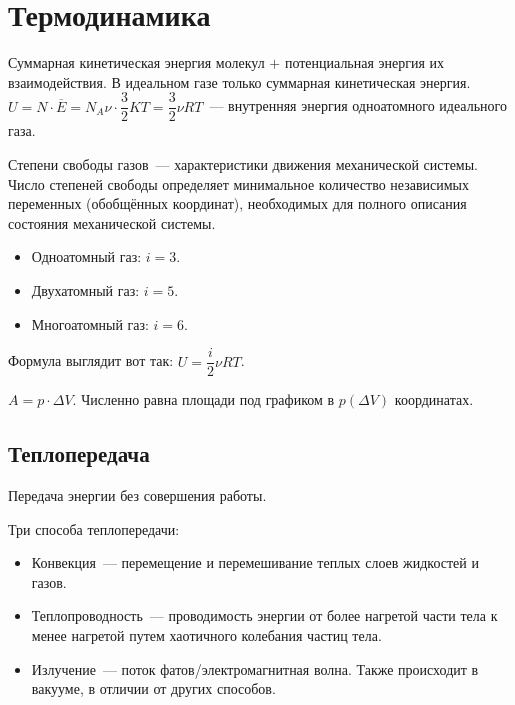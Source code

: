 \documentclass[12pt]{article}
\begin{document}
	\section{Термодинамика}
	\begin{definition}
		Суммарная кинетическая энергия молекул $+$ потенциальная энергия их взаимодействия. В идеальном газе только суммарная кинетическая энергия. $U = N \cdot \overline{E} = N_A \nu \cdot \dfrac{3}{2} KT = \dfrac{3}{2} \nu RT$~--- внутренняя энергия одноатомного идеального газа.
	\end{definition}
	\begin{definition}
		Степени свободы газов~--- характеристики движения механической системы. Число степеней свободы определяет минимальное количество независимых переменных (обобщённых координат), необходимых для полного описания состояния механической системы.
		\begin{itemize}
			\item Одноатомный газ: $i = 3$.
			\item Двухатомный газ: $i = 5$.
			\item Многоатомный газ: $i = 6$.
		\end{itemize}
		Формула выглядит вот так: $U = \dfrac{i}{2} \nu RT$.
	\end{definition}
	\begin{definition}
		$A = p \cdot \varDelta V$. Численно равна площади под графиком в $p(\varDelta V)$ координатах.
	\end{definition}
	\subsection{Теплопередача}
	\begin{definition}[Теплопередача]
		Передача энергии без совершения работы.
	\end{definition}
	Три способа теплопередачи:
	\begin{itemize}
		\item Конвекция~--- перемещение и перемешивание теплых слоев жидкостей и газов.
		\item Теплопроводность~--- проводимость энергии от более нагретой части тела к менее нагретой путем хаотичного колебания частиц тела.
		\item Излучение~--- поток фатов/электромагнитная волна. Также происходит в вакууме, в отличии от других способов.
	\end{itemize}
\end{document}
